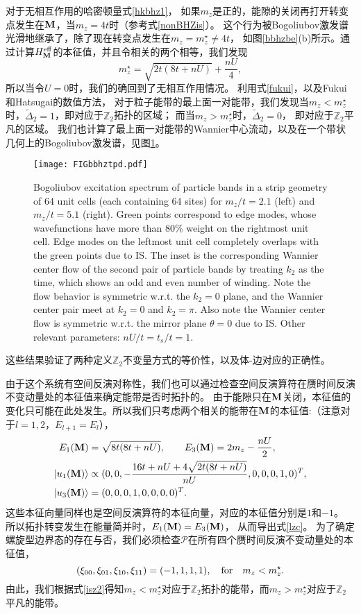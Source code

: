 对于无相互作用的哈密顿量式\eqref{hkbhz1}，
如果$m_z$是正的，能隙的关闭再打开转变点发生在$\vb M$，当$m_z=4t$时（参考式\eqref{nonBHZis}）。
这个行为被Bogoliubov激发谱光滑地继承了，除了现在转变点发生在$m_z=m_z^\star\neq4t$，
如图\ref{bbhzbe}(b)所示。通过计算$H_{\vb M}^{\text{eff}}$的本征值，并且令相关的两个相等，我们发现
\begin{equation}\label{lzc}
	m_z^\star= \sqrt{2t(8t+nU)}+\frac{nU}{4},
\end{equation}
所以当令$U=0$时，我们的确回到了无相互作用情况。
利用式\eqref{fukui}，以及Fukui和Hatsugai的数值方法\cite{Fukui2007}，
对于粒子能带的最上面一对能带，我们发现当$m_z<m_z^\star$时，$\tilde \Delta_2=1$，即对应于$\mathbb Z_2$拓扑的区域；
而当$m_z>m_z^\star$时，$\tilde \Delta_2=0$，
即对应于$\mathbb Z_2$平凡的区域。
我们也计算了最上面一对能带的Wannier中心流动，以及在一个带状几何上的Bogoliubov激发谱，见图\ref{bbhztpd}。%
\begin{figure}
\centering
	\texttt{[image: FIGbbhztpd.pdf]}
	\caption{\label{bbhztpd} Bogoliubov excitation spectrum of particle bands in a strip geometry of $64$ unit cells (each containing $64$ sites) for $m_z/t=2.1$ (left) and $m_z/t=5.1$ (right). Green points correspond to edge modes, whose wavefunctions have more than $80\%$ weight on the rightmost unit cell. Edge modes on the leftmost unit cell completely overlaps with the green points due to IS. The inset is the corresponding Wannier center flow of the second pair of particle bands by treating $k_2$ as the time, which shows an odd and even number of winding. Note the flow behavior is symmetric w.r.t. the $k_2=0$ plane, and the Wannier center pair meet at $k_2=0$ and $k_2=\pi$. Also note the Wannier center flow is symmetric w.r.t. the mirror plane $\theta=0$ due to IS. Other relevant parameters: $nU/t=t_s/t=1$.}
\end{figure}
这些结果验证了两种定义$\mathbb Z_2$不变量方式的等价性，以及体-边对应的正确性。

由于这个系统有空间反演对称性，我们也可以通过检查空间反演算符在赝时间反演不变动量处的本征值来确定能带是否时拓扑的。
由于能隙只在$\vb M$关闭，本征值的变化只可能在此处发生。所以我们只考虑两个相关的能带在$\vb M$的本征值:（注意对于$l=1,2$，$E_{l+1}=E_l$），
\begin{equation*}
	\begin{split}
		E_1(\vb M) &=\sqrt{8t(8t+nU)},\qquad E_3(\vb M)=2m_z-\frac{nU}{2}, \\
		\ket{u_1(\vb M)} &\propto (0,0,-\frac{16t + nU +4\sqrt{2t(8t+nU)}}{nU},0,0,0,1,0)^T, \\ \ket{u_3(\vb M)} &= (0,0,0,1,0,0,0,0)^T.
	\end{split}
\end{equation*}
这些本征向量同样也是空间反演算符的本征向量，对应的本征值分别是$1$和$-1$。
所以拓扑转变发生在能量简并时，$E_1(\vb M)=E_3(\vb M)$，
从而导出式\eqref{lzc}。
为了确定螺旋型边界态的存在与否，我们必须检查$\mathcal P$在所有四个赝时间反演不变动量处的本征值，
\begin{equation*}
	(\xi_{00},\xi_{01},\xi_{10},\xi_{11})=(-1,1,1,1),\qfor m_z<m_z^\star.
\end{equation*}
由此，我们根据式\eqref{isz2}得知$m_z<m_z^\star$对应于$\mathbb Z_2$拓扑的能带，而$m_z>m_z^\star$对应于$\mathbb Z_2$平凡的能带。

